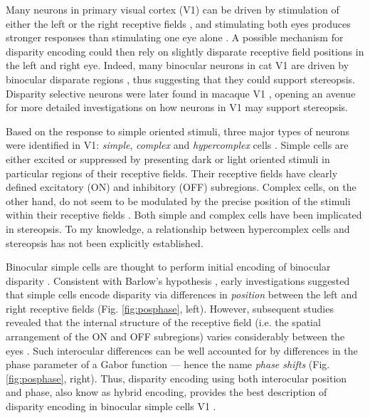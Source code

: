 Many neurons in primary visual cortex (V1) can be driven by stimulation of either the left or the right receptive fields \cite{HUBEL:1959tz,HUBEL:1962ti, Poggio1972}, and stimulating both eyes produces stronger responses than stimulating one eye alone \cite{HUBEL:1959tz,HUBEL:1962ti}. A possible mechanism for disparity encoding could then rely on slightly disparate receptive field positions in the left and right eye. Indeed, many binocular neurons in cat V1 are driven by binocular disparate regions \cite{Barlow:1967bs,Pettigrew:1968zr,Nikara:1968ys}, thus suggesting that they could support stereopsis. Disparity selective neurons were later found in macaque V1 \cite{Poggio:1977ys,Poggio:1981tg}, opening an avenue for more detailed investigations on how neurons in V1 may support stereopsis.

Based on the response to simple oriented stimuli, three major types of neurons were identified in V1: \textit{simple}, \textit{complex} and \textit{hypercomplex} cells \cite{HUBEL:1962ti,Hubel:1968hz}. Simple cells are either excited or suppressed by presenting dark or light oriented stimuli in particular regions of their receptive fields. Their receptive fields have clearly defined excitatory (ON) and inhibitory (OFF) subregions. Complex cells, on the other hand, do not seem to be modulated by the precise position of the stimuli within their receptive fields \cite{HUBEL:1962ti,Hubel:1968hz}. Both simple and complex cells have been implicated in stereopsis. To my knowledge, a relationship between hypercomplex cells and stereopsis has not been explicitly established. 

Binocular simple cells are thought to perform initial encoding of binocular disparity \cite{Anzai1999,Cumming:1997fk,Ohzawa:1997bd,Ohzawa:1990cq,Ohzawa:1986xy}. Consistent with Barlow's hypothesis \cite{Barlow:1967bs}, early investigations suggested that simple cells encode disparity via differences in \textit{position} between the left and right receptive fields \cite{Heydt:1978mi,Ferster:1981kl} (Fig. \ref{fig:posphase}, left). However, subsequent studies revealed that the internal structure of the receptive field (i.e. the spatial arrangement of the ON and OFF subregions) varies considerably between the eyes \cite{DeAngelis:1991mb,Anzai:1997ud,Anzai:1999xd,Anzai:1999uq,Tsao:2003pi}. Such interocular differences can be well accounted for by differences in the phase parameter of a Gabor function --- hence the name \textit{phase shifts} \cite{DeAngelis1991,Prince:2002uq,Tsao:2003pi} (Fig. \ref{fig:posphase}, right). Thus, disparity encoding using both interocular position and phase, also know as hybrid encoding, provides the best description of disparity encoding in binocular simple cells V1 \cite{Anzai:1997ud,Anzai:1999xd,Prince:2002uq,Tsao:2003pi}.

